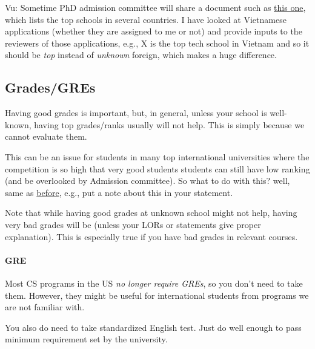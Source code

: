 \documentclass[10pt]{article}
\newcommand{\red}[1]{{\color{red}{#1}}}
\begin{document}
\begin{tcolorbox}[left=1pt,right=1pt,top=1pt,bottom=1pt]
Vu: Sometime PhD admission committee will share a document such as \href{https://github.com/dynaroars/dynaroars.github.io/wiki/Foreign-Top-Schools}{this one}, which lists the top schools in several countries. I have looked at Vietnamese applications (whether they are assigned to me or not) and provide inputs to the reviewers of those applications, e.g., X is the top tech school in Vietnam and so it should be \emph{top} instead of \emph{unknown} foreign, which makes a huge difference.
\end{tcolorbox}

\subsection{Grades/GREs}\label{sec:grades}
Having good grades is important, but, in general, unless your school is well-known, having top grades/ranks
usually will not help. This is simply because we cannot evaluate them.

This can be an issue for students in many top international universities where the competition is so high that very good students students can still have low ranking (and be overlooked by Admission committee).
So what to do with this? well, same as \hyperref[sec:your-school]{before}, e.g., put a note about this in your statement.

Note that while having good grades at unknown school might not help,
having very bad grades will be \red{red flag} (unless your LORs or
statements give proper explanation). This is especially true if you
have bad grades in relevant courses.

\paragraph{GRE} Most CS programs in the US \emph{no longer require GREs}, so you don't need to
take them. However, they might be useful for international students from programs we are not familiar with. 

You also do need to
take standardized English test. Just do well enough to pass minimum
requirement set by the university.
\end{document}

